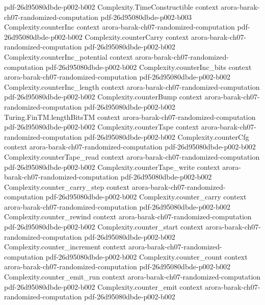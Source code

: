\begin{theorem}
  {pdf-26d95080dbde-p002-b002}
\proofstep
  {Complexity.TimeConstructible}
  {context}
  {arora-barak-ch07-randomized-computation}
  {pdf-26d95080dbde-p002-b003}
\proofstep
  {Complexity.counterInc}
  {context}
  {arora-barak-ch07-randomized-computation}
  {pdf-26d95080dbde-p002-b002}
\proofstep
  {Complexity.counterCarry}
  {context}
  {arora-barak-ch07-randomized-computation}
  {pdf-26d95080dbde-p002-b002}
\proofstep
  {Complexity.counterInc_potential}
  {context}
  {arora-barak-ch07-randomized-computation}
  {pdf-26d95080dbde-p002-b002}
\proofstep
  {Complexity.counterInc_bits}
  {context}
  {arora-barak-ch07-randomized-computation}
  {pdf-26d95080dbde-p002-b002}
\proofstep
  {Complexity.counterInc_length}
  {context}
  {arora-barak-ch07-randomized-computation}
  {pdf-26d95080dbde-p002-b002}
\proofstep
  {Complexity.counterBump}
  {context}
  {arora-barak-ch07-randomized-computation}
  {pdf-26d95080dbde-p002-b002}
\proofstep
  {Turing.FinTM.lengthBitsTM}
  {context}
  {arora-barak-ch07-randomized-computation}
  {pdf-26d95080dbde-p002-b002}
\proofstep
  {Complexity.counterTape}
  {context}
  {arora-barak-ch07-randomized-computation}
  {pdf-26d95080dbde-p002-b002}
\proofstep
  {Complexity.counterCfg}
  {context}
  {arora-barak-ch07-randomized-computation}
  {pdf-26d95080dbde-p002-b002}
\proofstep
  {Complexity.counterTape_read}
  {context}
  {arora-barak-ch07-randomized-computation}
  {pdf-26d95080dbde-p002-b002}
\proofstep
  {Complexity.counterTape_write}
  {context}
  {arora-barak-ch07-randomized-computation}
  {pdf-26d95080dbde-p002-b002}
\proofstep
  {Complexity.counter_carry_step}
  {context}
  {arora-barak-ch07-randomized-computation}
  {pdf-26d95080dbde-p002-b002}
\proofstep
  {Complexity.counter_carry}
  {context}
  {arora-barak-ch07-randomized-computation}
  {pdf-26d95080dbde-p002-b002}
\proofstep
  {Complexity.counter_rewind}
  {context}
  {arora-barak-ch07-randomized-computation}
  {pdf-26d95080dbde-p002-b002}
\proofstep
  {Complexity.counter_start}
  {context}
  {arora-barak-ch07-randomized-computation}
  {pdf-26d95080dbde-p002-b002}
\proofstep
  {Complexity.counter_increment}
  {context}
  {arora-barak-ch07-randomized-computation}
  {pdf-26d95080dbde-p002-b002}
\proofstep
  {Complexity.counter_count}
  {context}
  {arora-barak-ch07-randomized-computation}
  {pdf-26d95080dbde-p002-b002}
\proofstep
  {Complexity.counter_emit_run}
  {context}
  {arora-barak-ch07-randomized-computation}
  {pdf-26d95080dbde-p002-b002}
\proofstep
  {Complexity.counter_emit}
  {context}
  {arora-barak-ch07-randomized-computation}
  {pdf-26d95080dbde-p002-b002}
\proofstep

\end{theorem}
